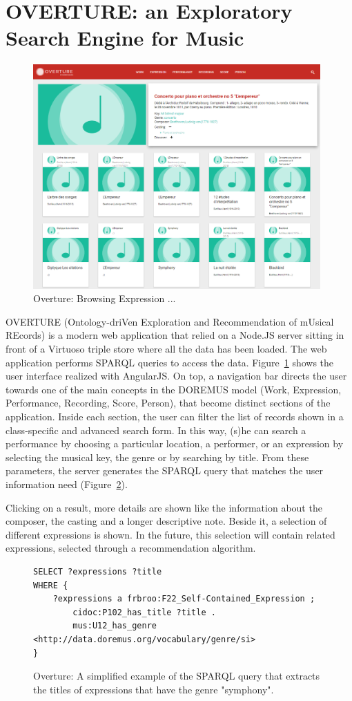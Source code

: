 \documentclass[runningheads,a4paper]{llncs}
\begin{document}
\section{OVERTURE: an Exploratory Search Engine for Music}
\label{sec:overture}
\begin{figure}
  \centering
  \includegraphics[width=11cm]{img/overture-detail.png}
  \caption{Overture: Browsing Expression ...}
  \label{fig:overture-detail}
\end{figure}

OVERTURE (Ontology-driVen Exploration and Recommendation of mUsical REcords) is a modern web application that relied on a Node.JS server sitting in front of a Virtuoso triple store where all the data has been loaded. The web application performs SPARQL queries to access the data. Figure~\ref{fig:overture-detail} shows the user interface realized with AngularJS. On top, a navigation bar directs the user towards one of the main concepts in the DOREMUS model (Work, Expression, Performance, Recording, Score, Person), that become distinct sections of the application. Inside each section, the user can filter the list of records shown in a class-specific and advanced search form. In this way, (s)he can search a performance by choosing a particular location, a performer, or an expression by selecting the musical key, the genre or by searching by title. From these parameters, the server generates the SPARQL query that matches the user information need (Figure~\ref{fig:sparql}).

Clicking on a result, more details are shown like the information about the composer, the casting and a longer descriptive note. Beside it, a selection of different expressions is shown. In the future, this selection will contain related expressions, selected through a recommendation algorithm.
\begin{figure}
\centering
\begin{verbatim}
SELECT ?expressions ?title
WHERE {
    ?expressions a frbroo:F22_Self-Contained_Expression ;
        cidoc:P102_has_title ?title .
        mus:U12_has_genre <http://data.doremus.org/vocabulary/genre/si>
}
\end{verbatim}
\caption{Overture: A simplified example of the SPARQL query that extracts the titles of expressions that have the genre "symphony".}
\label{fig:sparql}
\end{figure}
\end{document}
